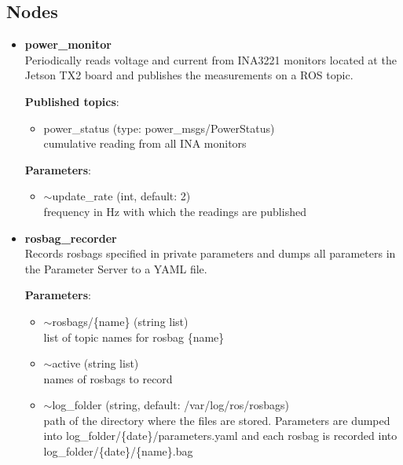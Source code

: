 \documentclass[english,inz,shortabstract]{iithesis}
\newcommand{\val}[1]{\textbf{\textsf{#1}}}
\begin{document}
	\subsection{Nodes}
		\begin{itemize}
			\item \val{power\_monitor}\\
			Periodically reads voltage and current from INA3221 monitors located at the Jetson TX2 board and publishes the measurements on a ROS topic.

			\textbf{Published topics}:
			\begin{itemize}[itemsep=0pt, parsep=2pt, topsep=0pt]
				\item \textsf{power\_status} (type: \textsf{power\_msgs/PowerStatus})\\
				cumulative reading from all INA monitors
			\end{itemize}

			\textbf{Parameters}:
			\begin{itemize}[itemsep=0pt, parsep=2pt, topsep=0pt]
				\item \textsf{$\sim$update\_rate} (\textsf{int}, default: \textsf{2})\\
				frequency in Hz with which the readings are published
			\end{itemize}

			\item \val{rosbag\_recorder}\\
			Records rosbags specified in private parameters and dumps all parameters in the Parameter Server to a YAML file.

			\textbf{Parameters}:
			\begin{itemize}[itemsep=0pt, parsep=2pt, topsep=0pt]
				\item \textsf{$\sim$rosbags/\{name\}} (\textsf{string list})\\
				list of topic names for rosbag \{name\}
				\item \textsf{$\sim$active} (\textsf{string list})\\
				names of rosbags to record
				\item \textsf{$\sim$log\_folder} (\textsf{string}, default: \textsf{/var/log/ros/rosbags})\\
				path of the directory where the files are stored. Parameters are dumped into \textsf{log\_folder/\{date\}/parameters.yaml} and each rosbag is recorded into \textsf{log\_folder/\{date\}/\{name\}.bag}
			\end{itemize}
		\end{itemize}
\end{document}
